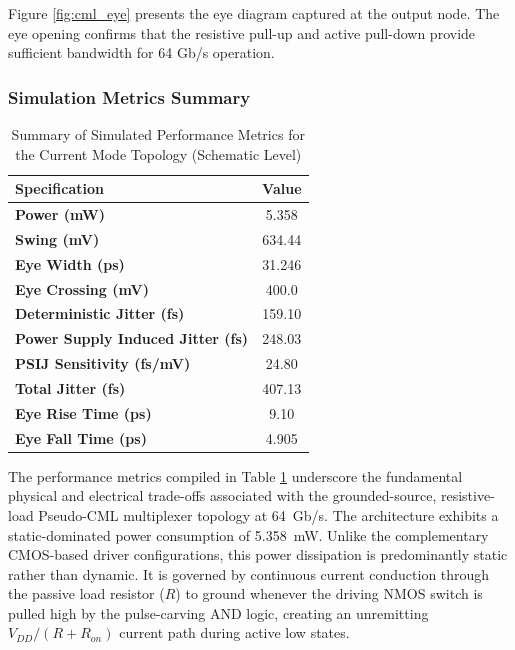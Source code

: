 Figure \ref{fig:cml_eye} presents the eye diagram captured at the output node. The eye opening confirms that the resistive pull-up and active pull-down provide sufficient bandwidth for 64 Gb/s operation.

\subsubsection*{Simulation Metrics Summary}
\label{subsubsec:cml_sim_metrics}

\begin{table}[H]
    \centering
    \caption{Summary of Simulated Performance Metrics for the Current Mode Topology (Schematic Level)}
    \label{tab:cml_metrics}
    \renewcommand{\arraystretch}{1.4}
    \setlength{\tabcolsep}{12pt}
    \begin{tabular}{|l|c|}
        \hline
        \textbf{Specification} & \textbf{Value} \\ \hline
        \textbf{Power (mW)} & 5.358 \\ \hline
        \textbf{Swing (mV)} & 634.44 \\ \hline
        \textbf{Eye Width (ps)} & 31.246 \\ \hline
        \textbf{Eye Crossing (mV)} & 400.0 \\ \hline
        \textbf{Deterministic Jitter (fs)} & 159.10 \\ \hline
        \textbf{Power Supply Induced Jitter (fs)} & 248.03 \\ \hline
        \textbf{PSIJ Sensitivity (fs/mV)} & 24.80 \\ \hline
        \textbf{Total Jitter (fs)} & 407.13 \\ \hline
        \textbf{Eye Rise Time (ps)} & 9.10 \\ \hline
        \textbf{Eye Fall Time (ps)} & 4.905 \\ \hline
    \end{tabular}
\end{table}

The performance metrics compiled in Table \ref{tab:cml_metrics} underscore the fundamental physical and electrical trade-offs associated with the grounded-source, resistive-load Pseudo-CML multiplexer topology at 64~Gb/s. The architecture exhibits a static-dominated power consumption of 5.358~mW. Unlike the complementary CMOS-based driver configurations, this power dissipation is predominantly static rather than dynamic. It is governed by continuous current conduction through the passive load resistor ($R$) to ground whenever the driving NMOS switch is pulled high by the pulse-carving AND logic, creating an unremitting $V_{DD}/(R + R_{on})$ current path during active low states.

